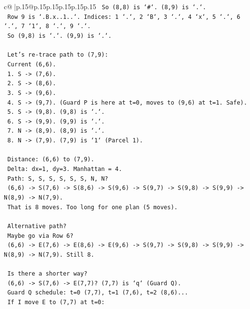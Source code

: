 \documentclass{article}
\begin{document}
{\begin{supertabular}{c@{$\;$}|p{.15\linewidth}@{}p{.15\linewidth}p{.15\linewidth}p{.15\linewidth}p{.15\linewidth}p{.15\linewidth}}
{{{\texttt{       So (8,8) is `\#`. (8,9) is `.`.} \\
\texttt{       Row 9 is `.B.x..1..`. Indices: 1 `.`, 2 `B`, 3 `.`, 4 `x`, 5 `.`, 6 `.`, 7 `1`, 8 `.`, 9 `.`.} \\
\texttt{       So (9,8) is `.`. (9,9) is `.`.} \\
\\ 
\texttt{    Let's re{-}trace path to (7,9):} \\
\texttt{    Current (6,6).} \\
\texttt{    1. S {-}> (7,6).} \\
\texttt{    2. S {-}> (8,6).} \\
\texttt{    3. S {-}> (9,6).} \\
\texttt{    4. S {-}> (9,7). (Guard P is here at t=0, moves to (9,6) at t=1. Safe).} \\
\texttt{    5. S {-}> (9,8). (9,8) is `.`.} \\
\texttt{    6. S {-}> (9,9). (9,9) is `.`.} \\
\texttt{    7. N {-}> (8,9). (8,9) is `.`.} \\
\texttt{    8. N {-}> (7,9). (7,9) is `1` (Parcel 1).} \\
\\ 
\texttt{    Distance: (6,6) to (7,9).} \\
\texttt{    Delta: dx=1, dy=3. Manhattan = 4.} \\
\texttt{    Path: S, S, S, S, S, S, N, N?} \\
\texttt{    (6,6) {-}> S(7,6) {-}> S(8,6) {-}> S(9,6) {-}> S(9,7) {-}> S(9,8) {-}> S(9,9) {-}> N(8,9) {-}> N(7,9).} \\
\texttt{    That is 8 moves. Too long for one plan (5 moves).} \\
\\ 
\texttt{    Alternative path?} \\
\texttt{    Maybe go via Row 6?} \\
\texttt{    (6,6) {-}> E(7,6) {-}> E(8,6) {-}> E(9,6) {-}> S(9,7) {-}> S(9,8) {-}> S(9,9) {-}> N(8,9) {-}> N(7,9). Still 8.} \\
\\ 
\texttt{    Is there a shorter way?} \\
\texttt{    (6,6) {-}> S(7,6) {-}> E(7,7)? (7,7) is `q` (Guard Q).} \\
\texttt{    Guard Q schedule: t=0 (7,7), t=1 (7,6), t=2 (8,6)...} \\
\texttt{    If I move E to (7,7) at t=0:} \\
}}}
\end{supertabular}}
\end{document}
